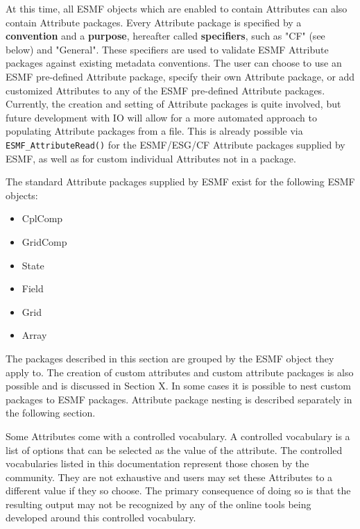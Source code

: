 %


\label{desc:AttPacks}

At this time, all ESMF objects which are enabled to contain Attributes can also contain Attribute packages.  Every Attribute package is specified by a {\bf convention} and a {\bf purpose}, hereafter called {\bf specifiers}, such as "CF" (see below) and "General".  These specifiers are used to validate ESMF Attribute packages against existing metadata conventions.  The user can choose to use an ESMF pre-defined Attribute package, specify their own Attribute package, or add customized Attributes to any of the ESMF pre-defined Attribute packages. Currently, the creation and setting of Attribute packages is quite involved, but future development with IO will allow for a more automated approach to populating Attribute packages from a file.  This is already possible via {\tt ESMF\_AttributeRead()} for the ESMF/ESG/CF Attribute packages supplied by ESMF, as well as for custom individual Attributes not in a package.

The standard Attribute packages supplied by ESMF exist for the following ESMF objects:

\begin{itemize}
    \item CplComp
    \item GridComp
    \item State
    \item Field
    \item Grid
    \item Array
\end{itemize}

The packages described in this section are grouped by the ESMF object they apply to. The creation of custom attributes and custom attribute packages is also possible and is discussed in Section X. In some cases it is possible to nest custom packages to ESMF packages. Attribute package nesting is described separately in the following section.  

Some Attributes come with a controlled vocabulary. A controlled vocabulary is a list of options that can be selected as the value of the attribute. The controlled vocabularies listed in this documentation represent those chosen by the community. They are not exhaustive and users may set these Attributes to a different value if they so choose. The primary consequence of doing so is that the resulting output may not be recognized by any of the online tools being developed around this controlled vocabulary.  

